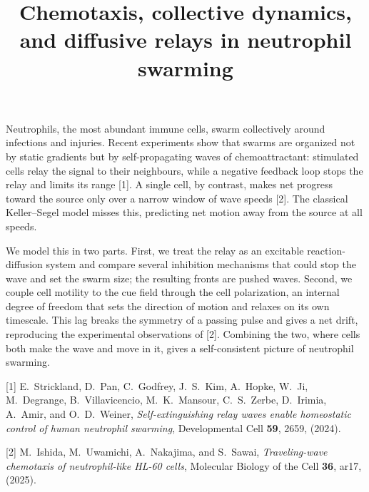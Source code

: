 \documentclass{article}
\date{}
\title{Chemotaxis, collective dynamics, and diffusive relays in neutrophil swarming}
\author{\authorlist{}} %
\begin{document}
\maketitle

Neutrophils, the most abundant immune cells, swarm collectively around
infections and injuries. Recent experiments show that swarms are organized not
by static gradients but by self-propagating waves of chemoattractant:
stimulated cells relay the signal to their neighbours, while a negative
feedback loop stops the relay and limits its range [1]. A single
cell, by contrast, makes net progress toward the source only over a narrow
window of wave speeds [2]. The classical Keller--Segel model misses this,
predicting net motion away from the source at all speeds.

We model this in two parts. First, we treat the relay as an excitable
reaction-diffusion system and compare several inhibition mechanisms that could
stop the wave and set the swarm size; the resulting fronts are pushed waves.
Second, we couple cell motility to the cue field through the cell polarization, an
internal degree of freedom that sets the direction of motion and relaxes on its
own timescale. This lag breaks the symmetry of a passing pulse and gives a net
drift, reproducing the experimental observations of [2]. Combining the two, where cells both
make the wave and move in it, gives a self-consistent picture of neutrophil
swarming.

[1] E.~Strickland, D.~Pan, C.~Godfrey, J.~S.~Kim, A.~Hopke, W.~Ji, M.~Degrange,
B.~Villavicencio, M.~K.~Mansour, C.~S.~Zerbe, D.~Irimia, A.~Amir, and
O.~D.~Weiner, \textit{Self-extinguishing relay waves enable homeostatic control
of human neutrophil swarming}, Developmental Cell {\bf 59}, 2659, (2024).

[2] M.~Ishida, M.~Uwamichi, A.~Nakajima, and S.~Sawai,
\textit{Traveling-wave chemotaxis of neutrophil-like HL-60 cells},
Molecular Biology of the Cell {\bf 36}, ar17, (2025).

\end{document}
